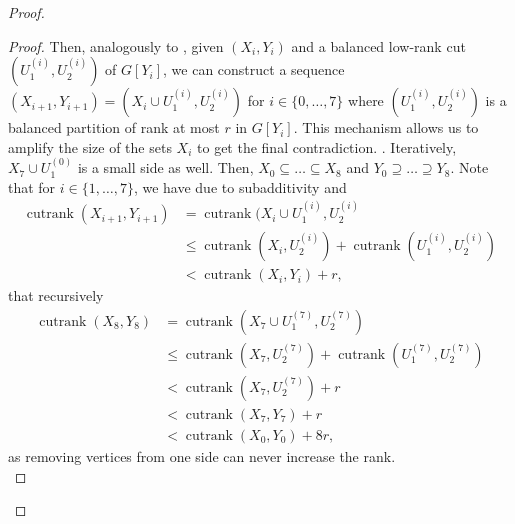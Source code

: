 \documentclass{article}
\theoremstyle{definition}
\begin{document}
\begin{proof}
\begin{proof}
Then, analogously to \cite{Dvorak_Norin_2018}, given $(X_i, Y_i)$ and a balanced low-rank cut $(U_1^{(i)}, U_2^{(i)})$ of $G[Y_i]$, we can construct a sequence $(X_{i+1},Y_{i+1}) = (X_i \cup U_1^{(i)}, U_2^{(i)})$ for $i\in \{0,\dots,7\}$ where $(U_1^{(i)},U_2^{(i)})$ is a balanced partition of rank at most $r$ in $G[Y_{i}]$. This mechanism allows us to amplify the size of the sets $X_i$ to get the final contradiction. . Iteratively, $X_7\cup U_1^{(0)}$ is a small side as well. Then, $X_0\subseteq\dots\subseteq X_8$ and $Y_0 \supseteq\dots\supseteq Y_8$. Note that for $i\in \{1,\dots,7\}$, we have due to subadditivity and
\begin{align*}
    \operatorname{cutrank}(X_{i+1}, Y_{i+1}) &= \operatorname{cutrank}(X_i \cup U_1^{(i)}, U_2^{(i)} \\
    &\leq \operatorname{cutrank}(X_i, U_2^{(i)}) + \operatorname{cutrank}(U_1^{(i)}, U_2^{(i)}) \\
    &< \operatorname{cutrank}(X_i, Y_i) + r,
\end{align*}
that recursively
\begin{align*}\operatorname{cutrank}(X_8, Y_8) &= \operatorname{cutrank}(X_7\cup U_1^{(7)}, U_2^{(7)}) \\ &\leq \operatorname{cutrank}(X_7, U_2^{(7)})+\operatorname{cutrank}(U_1^{(7)}, U_2^{(7)}) \\ &< \operatorname{cutrank}(X_7, U_2^{(7)})+r \\ &< \operatorname{cutrank}(X_7, Y_7)+r  \\ &< \operatorname{cutrank}(X_0, Y_0)+8r,\end{align*}
as removing vertices from one side can never increase the rank. \\


\end{proof}
\end{proof}
\end{document}
